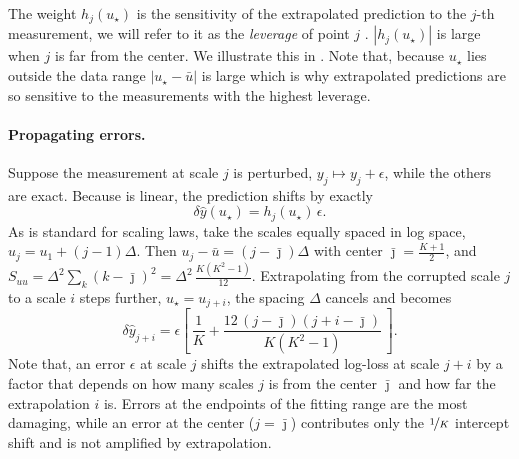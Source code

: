 The weight $h_j(u_\star)$ is the sensitivity of the extrapolated prediction to the $j$-th measurement, we will refer to it as the \emph{leverage} of point $j$ \citep{hastie2009elements}. $|h_j(u_\star)|$ is large when $j$ is far from the center.
We illustrate this in .
Note that, because $u_\star$ lies outside the data range $|u_\star - \bar u|$ is large which is why extrapolated predictions are so sensitive to the measurements with the highest leverage.



\paragraph{Propagating errors.}
Suppose the measurement at scale $j$ is perturbed, $y_j \mapsto y_j + \epsilon$, while the others are exact. Because  is linear, the prediction shifts by exactly
%
\begin{equation}\label{eq:single-error}
    \delta \hat y(u_\star) = h_j(u_\star)\, \epsilon.
\end{equation}
%
As is standard for scaling laws, take the scales equally spaced in log space, $u_j = u_1 + (j - 1)\Delta$. Then $u_j - \bar u = (j - \bar\jmath)\Delta$ with center $\bar\jmath = \tfrac{K+1}{2}$, and $S_{uu} = \Delta^2 \sum_k (k - \bar\jmath)^2 = \Delta^2\, \tfrac{K(K^2 - 1)}{12}$. Extrapolating from the corrupted scale $j$ to a scale $i$ steps further, $u_\star = u_{j+i}$, the spacing $\Delta$ cancels and  becomes
%
\begin{equation}\label{eq:propagation}
    \delta \hat y_{j+i} = \epsilon \left[\, \frac{1}{K} + \frac{12\, (j - \bar\jmath)(j + i - \bar\jmath)}{K(K^2 - 1)} \,\right].
\end{equation}
%
Note that, an error $\epsilon$ at scale $j$ shifts the extrapolated log-loss at scale $j + i$ by a factor that depends on how many scales $j$ is from the center $\bar\jmath$ and how far the extrapolation $i$ is. Errors at the endpoints of the fitting range are the most damaging, while an error at the center ($j = \bar\jmath$) contributes only the $\nicefrac{1}{K}$ intercept shift and is not amplified by extrapolation.

